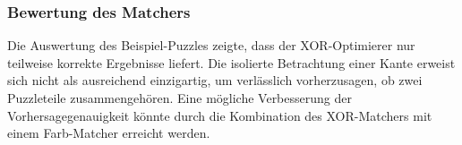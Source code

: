 \subsubsection*{Bewertung des Matchers}
Die Auswertung des Beispiel-Puzzles zeigte, dass der XOR-Optimierer nur teilweise korrekte Ergebnisse liefert. Die isolierte Betrachtung einer Kante erweist sich nicht als ausreichend einzigartig, um verlässlich vorherzusagen, ob zwei Puzzleteile zusammengehören. Eine mögliche Verbesserung der Vorhersagegenauigkeit könnte durch die Kombination des XOR-Matchers mit einem Farb-Matcher erreicht werden.